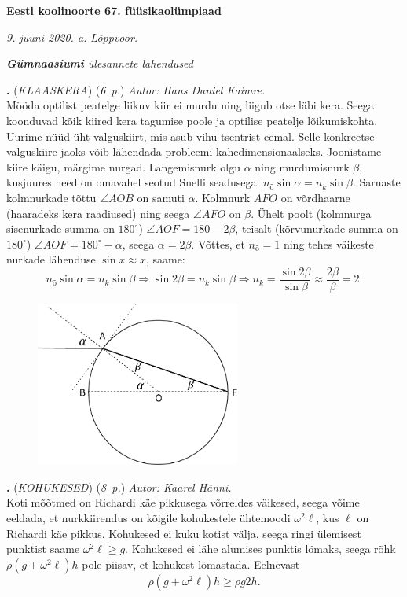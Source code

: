 \documentclass[11pt,a5paper]{article}
\newcommand{\numb}[1]{\vspace{5pt}\textbf{\large #1}}
\newcommand{\nimi}[1]{(\textsl{\small #1})}
\newcommand{\punktid}[1]{(\emph{#1~p.})}
\newcounter{ylesanne}
\newcommand{\yl}[1]{\addtocounter{ylesanne}{1}\numb{\theylesanne.} \nimi{#1} \newblock{}}
\newcommand{\autor}[1]{\emph{ Autor: #1.\\}}
\begin{document}
\begin{center}
\textbf{\Large Eesti koolinoorte 67. füüsikaolümpiaad} \vspace{2pt}

\emph{9. juuni 2020. a. Lõppvoor.}

\emph{{\bf Gümnaasiumi} ülesannete lahendused}

\end{center}

\yl{KLAASKERA}
\punktid{6}
\autor{Hans Daniel Kaimre}
Mööda optilist peatelge liikuv kiir ei murdu ning liigub otse läbi kera. Seega koonduvad kõik kiired kera tagumise poole ja optilise peatelje lõikumiskohta. Uurime nüüd üht valguskiirt, mis asub vihu tsentrist eemal. Selle konkreetse valguskiire jaoks võib lähendada probleemi kahedimensionaalseks. Joonistame kiire käigu, märgime nurgad. Langemisnurk olgu $\alpha$ ning murdumisnurk $\beta$, kusjuures need on omavahel seotud Snelli seadusega: $n_{õ}\sin\alpha=n_{k}\sin\beta$. Sarnaste kolmnurkade tõttu $\angle AOB$ on samuti $\alpha$. Kolmnurk $AFO$ on võrdhaarne (haaradeks kera raadiused) ning seega $\angle AFO$ on $\beta$. Ühelt poolt (kolmnurga sisenurkade summa on $180^\circ$) $\angle AOF=180-2\beta$, teisalt (kõrvunurkade summa on $180^\circ$) $\angle AOF=180^\circ-\alpha$, seega $\alpha=2\beta$. Võttes, et $n_{õ}=1$ ning tehes väikeste nurkade lähenduse $\sin x \approx x$, saame:
$$n_{õ}\sin\alpha=n_{k}\sin\beta \Rightarrow \sin2\beta=n_{k}\sin\beta \Rightarrow n_k = \frac{\sin2\beta}{\sin\beta}\approx\frac{2\beta}{\beta}=2.$$
\begin{figure}[htbp!]
\centering
\includegraphics[width=0.6\textwidth]{klaasistkera_joonis.pdf}
\end{figure}

\yl{KOHUKESED}
\punktid{8}
\autor{Kaarel Hänni}
Koti mõõtmed on Richardi käe pikkusega võrreldes väikesed, seega võime eeldada, et nurkkiirendus on kõigile kohukestele ühtemoodi $\omega^2 \ell$, kus $\ell$ on Richardi käe pikkus. Kohukesed ei kuku kotist välja, seega ringi ülemisest punktist saame $\omega^2\ell\geq g$. Kohukesed ei lähe alumises punktis lömaks, seega rõhk $\rho (g+\omega^2 \ell) h$ pole piisav, et kohukest lömastada. Eelnevast
\[\rho (g+\omega^2 \ell) h\geq \rho g 2h.\]
\end{document}

